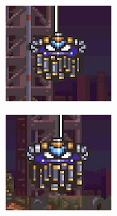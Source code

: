 \begin{figure}[htp]
	\centering
	\begin{subfigure}{0.3\linewidth}
		\centering
		\includegraphics[width=\linewidth]{figures/X2/Morph_moth/Moth_1.jpg}
	\end{subfigure}
	\begin{subfigure}{0.3\linewidth}
		\centering
		\includegraphics[width=\linewidth]{figures/X2/Morph_moth/Moth_2.jpg}

\end{subfigure}
\end{figure}
